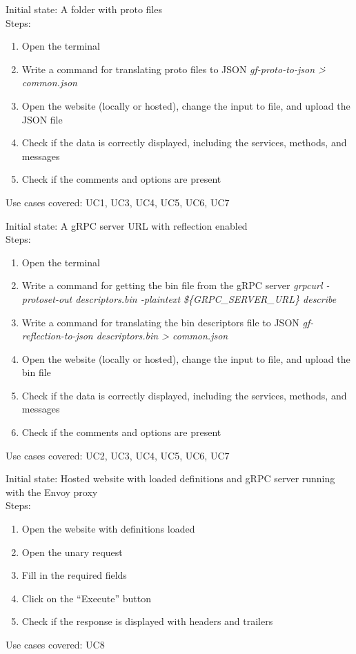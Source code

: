 Initial state: A folder with proto files\\
Steps:
\begin{enumerate}
    \item Open the terminal
    \item Write a command for translating proto files to JSON \textit{gf-proto-to-json \. > common.json}
    \item Open the website (locally or hosted), change the input to file, and upload the JSON file
    \item Check if the data is correctly displayed, including the services, methods, and messages
    \item Check if the comments and options are present
\end{enumerate}
Use cases covered: UC1, UC3, UC4, UC5, UC6, UC7

Initial state: A gRPC server URL with reflection enabled\\
Steps:
\begin{enumerate}
    \item Open the terminal
    \item Write a command for getting the bin file from the gRPC server \textit{grpcurl -protoset-out descriptors.bin -plaintext \$\{GRPC\_SERVER\_URL\} describe}
    \item Write a command for translating the bin descriptors file to JSON \textit{gf-reflection-to-json descriptors.bin > common.json}
    \item Open the website (locally or hosted), change the input to file, and upload the bin file
    \item Check if the data is correctly displayed, including the services, methods, and messages
    \item Check if the comments and options are present
\end{enumerate}
Use cases covered: UC2, UC3, UC4, UC5, UC6, UC7

Initial state: Hosted website with loaded definitions and gRPC server running with the Envoy proxy\\
Steps:
\begin{enumerate}
    \item Open the website with definitions loaded
    \item Open the unary request
    \item Fill in the required fields
    \item Click on the \enquote{Execute} button
    \item Check if the response is displayed with headers and trailers
\end{enumerate}
Use cases covered: UC8

